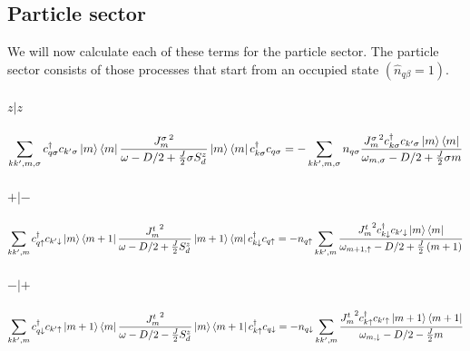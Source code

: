 \documentclass[12pt]{revtex4-2}
\begin{document}
\subsection{Particle sector}
We will now calculate each of these terms for the particle sector. The particle sector consists of those processes that start from an occupied state \(\left(\hat n_{q\beta} = 1\right)\).
\paragraph{\(z|z\)}
\begin{equation}\begin{aligned}
	\sum_{kk^\prime,m,\sigma} c^\dagger_{q \sigma} c_{k^\prime \sigma} \ket{m}\bra{m}\frac{{J^\sigma_m}^2}{\omega - D/2 + \frac{J}{2}\sigma S_d^z}\ket{m}\bra{m} c^\dagger_{k \sigma}c_{q \sigma} = -\sum_{kk^\prime,m,\sigma}n_{q \sigma}\frac{{J^\sigma_m}^2 c^\dagger_{k \sigma}c_{k^\prime\sigma} \ket{m}\bra{m}}{\omega_{m, \sigma} - D/2 + \frac{J}{2}\sigma m}
\end{aligned}\end{equation}

\paragraph{\(+|-\)}
\begin{equation}\begin{aligned}
	\sum_{kk^\prime,m} c^\dagger_{q \uparrow} c_{k^\prime \downarrow} \ket{m}\bra{m+1}\frac{{J^t_m}^2}{\omega - D/2 + \frac{J}{2}S_d^z}\ket{m+1}\bra{m} c^\dagger_{k \downarrow}c_{q \uparrow} = -n_{q \uparrow}\sum_{kk^\prime,m}\frac{{J^t_m}^2 c^\dagger_{k \downarrow}c_{k^\prime\downarrow} \ket{m}\bra{m}}{\omega_{m+1, \uparrow} - D/2 + \frac{J}{2}\left( m+1 \right) }
\end{aligned}\end{equation}

\paragraph{\(-|+\)}
\begin{equation}\begin{aligned}
	\sum_{kk^\prime,m} c^\dagger_{q \downarrow} c_{k^\prime \uparrow} \ket{m+1}\bra{m}\frac{{J^t_m}^2}{\omega - D/2 - \frac{J}{2}S_d^z}\ket{m}\bra{m+1} c^\dagger_{k \uparrow}c_{q \downarrow} = -n_{q \downarrow}\sum_{kk^\prime,m}\frac{{J^t_m}^2 c^\dagger_{k \uparrow}c_{k^\prime\uparrow} \ket{m+1}\bra{m+1}}{\omega_{m, \downarrow} - D/2 - \frac{J}{2}m}
\end{aligned}\end{equation}
\end{document}
